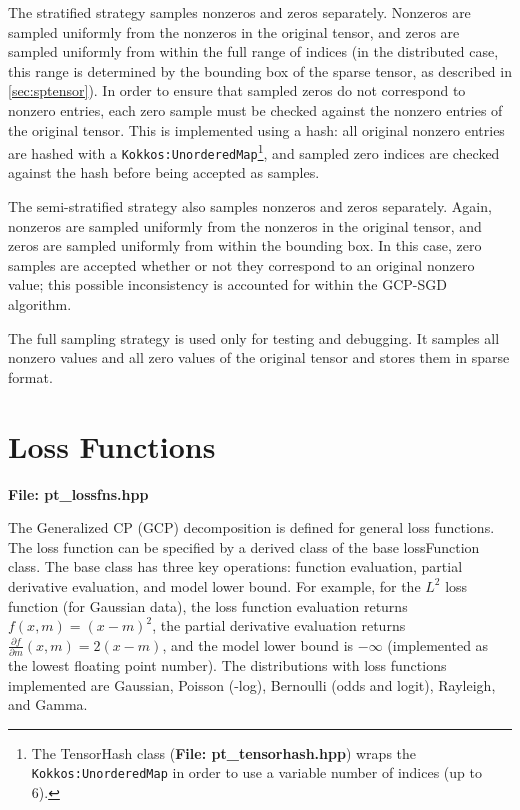 The stratified strategy samples nonzeros and zeros separately.
Nonzeros are sampled uniformly from the nonzeros in the original tensor, and zeros are sampled uniformly from within the full range of indices (in the distributed case, this range is determined by the bounding box of the sparse tensor, as described in \cref{sec:sptensor}).
In order to ensure that sampled zeros do not correspond to nonzero entries, each zero sample must be checked against the nonzero entries of the original tensor.
This is implemented using a hash: all original nonzero entries are hashed with a \texttt{Kokkos:UnorderedMap}\footnote{The TensorHash class ({\bf File: pt\_tensorhash.hpp}) wraps the \texttt{Kokkos:UnorderedMap} in order to use a variable number of indices (up to 6).}, and sampled zero indices are checked against the hash before being accepted as samples.

The semi-stratified strategy also samples nonzeros and zeros separately.
Again, nonzeros are sampled uniformly from the nonzeros in the original tensor, and zeros are sampled uniformly from within the bounding box.
In this case, zero samples are accepted whether or not they correspond to an original nonzero value; this possible inconsistency is accounted for within the GCP-SGD algorithm.

The full sampling strategy is used only for testing and debugging.
It samples all nonzero values and all zero values of the original tensor and stores them in sparse format.

\section{Loss Functions} \label{sec:lossfns}

{\bf File:  pt\_lossfns.hpp}

The Generalized CP (GCP) decomposition is defined for general loss functions.
The loss function can be specified by a derived class of the base lossFunction class.
The base class has three key operations: function evaluation, partial derivative evaluation, and model lower bound.
For example, for the $L^2$ loss function (for Gaussian data), the loss function evaluation returns $f(x,m) = (x-m)^2$, the partial derivative evaluation returns $\frac{\partial f}{\partial m}(x,m) = 2(x-m)$, and the model lower bound is $-\infty$ (implemented as the lowest floating point number).
The distributions with loss functions implemented are Gaussian, Poisson (-log), Bernoulli (odds and logit), Rayleigh, and Gamma. 

